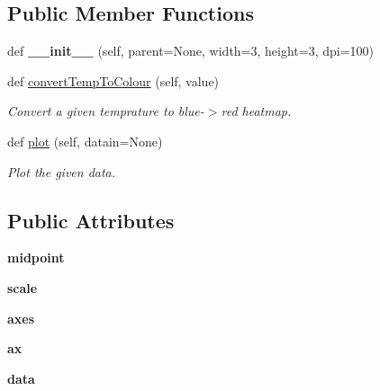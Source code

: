 \subsection*{Public Member Functions}
\begin{DoxyCompactItemize}
\item 
\mbox{\label{classguitools_1_1_plot_canvas_a2b960c100f32194f5c45516a98d9fed7}} 
def {\bfseries \+\_\+\+\_\+init\+\_\+\+\_\+} (self, parent=None, width=3, height=3, dpi=100)
\item 
\mbox{\label{classguitools_1_1_plot_canvas_aaeb126004d7e83f3acf624f6ef858eaf}} 
def \mbox{\hyperlink{classguitools_1_1_plot_canvas_aaeb126004d7e83f3acf624f6ef858eaf}{convert\+Temp\+To\+Colour}} (self, value)
\begin{DoxyCompactList}\small\item\em Convert a given temprature to blue-\/$>$red heatmap. \end{DoxyCompactList}\item 
\mbox{\label{classguitools_1_1_plot_canvas_abad400ab2e706fd53e201a4c95a96bf6}} 
def \mbox{\hyperlink{classguitools_1_1_plot_canvas_abad400ab2e706fd53e201a4c95a96bf6}{plot}} (self, datain=None)
\begin{DoxyCompactList}\small\item\em Plot the given data. \end{DoxyCompactList}\end{DoxyCompactItemize}
\subsection*{Public Attributes}
\begin{DoxyCompactItemize}
\item 
\mbox{\label{classguitools_1_1_plot_canvas_aaac5b531c51d028741224cae10487bb3}} 
{\bfseries midpoint}
\item 
\mbox{\label{classguitools_1_1_plot_canvas_aa9345a32f98c9bddc93e52ec7eab089f}} 
{\bfseries scale}
\item 
\mbox{\label{classguitools_1_1_plot_canvas_aa9772c144697d617734d653ee27c3950}} 
{\bfseries axes}
\item 
\mbox{\label{classguitools_1_1_plot_canvas_a632cb09ddb647fa555d5796ce31f93a9}} 
{\bfseries ax}
\item 
\mbox{\label{classguitools_1_1_plot_canvas_af9ee9cd0bb6c7361e5ad699cb6177e41}} 
{\bfseries data}
\end{DoxyCompactItemize}


